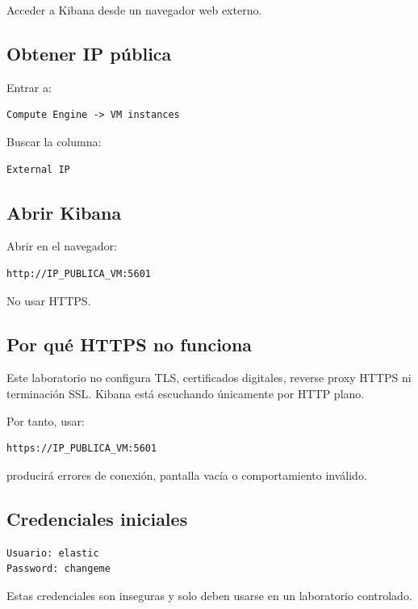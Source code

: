 \documentclass[
  coursetitle={Cómputo Nube y Tecnologías Emergentes},
  coursehours={96},
  coursedate={Verano 2026},
  doctype={Práctica},
  otherlangs={english,french},
  authorname={Lázaro},
  authorsurname={Bustio-Martínez},
  authortitle={PhD},
  role={Profesor Investigador},
  email={lbustio@inaoe.mx},
  phone={5559504000},
  ext={7459},
  institution={Instituto Nacional de Astrofísica, Óptica y Electrónica (INAOE)},
  department={Maestría en Ciencias en Tecnologías de Seguridad},
  address={Luis Enrique Erro 1, Sta. Ma. Tonantzintla, San Andrés Cholula, CP 72840, Puebla, México},
  margin={0.5in}
]{../../lbustio_lecture_notes}
\begin{document}
Acceder a Kibana desde un navegador web externo.

\subsection{Obtener IP pública}

Entrar a:

\begin{verbatim}
Compute Engine -> VM instances
\end{verbatim}

Buscar la columna:

\begin{verbatim}
External IP
\end{verbatim}

\subsection{Abrir Kibana}

Abrir en el navegador:

\begin{verbatim}
http://IP_PUBLICA_VM:5601
\end{verbatim}

No usar HTTPS.

\subsection{Por qué HTTPS no funciona}

Este laboratorio no configura TLS, certificados digitales, reverse proxy HTTPS ni terminación SSL. Kibana está escuchando únicamente por HTTP plano.

Por tanto, usar:

\begin{verbatim}
https://IP_PUBLICA_VM:5601
\end{verbatim}

producirá errores de conexión, pantalla vacía o comportamiento inválido.

\subsection{Credenciales iniciales}

\begin{verbatim}
Usuario: elastic
Password: changeme
\end{verbatim}

Estas credenciales son inseguras y solo deben usarse en un laboratorio controlado.
\end{document}
